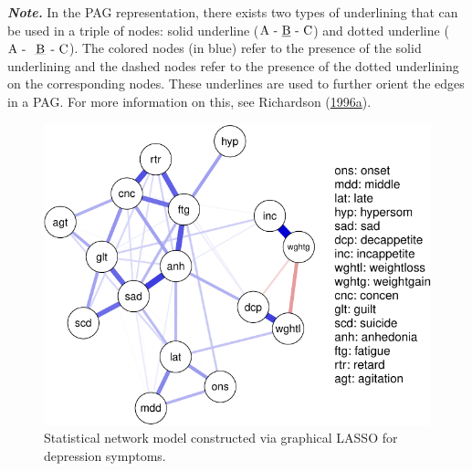 \documentclass[
]{article}
\begin{document}
\vspace{-0.1cm}

\noindent\small\textit{\textbf{Note.}} In the PAG representation, there exists two types of underlining that can be used in a triple of nodes: solid underline (\(\text{A - {\underline{B} - C}}\)) and dotted underline (\(\text{A - {
    \tikz[baseline=(todotted.base)]{
        \node[inner sep=1pt,outer sep=0pt] (todotted) {B};
        \draw[densely dotted] (todotted.south west) -- (todotted.south east);
    }
 - C}}\)). The colored nodes (in blue) refer to the presence of the solid underlining and the dashed nodes refer to the presence of the dotted underlining on the corresponding nodes. These underlines are used to further orient the edges in a PAG. For more information on this, see Richardson (\protect\hyperlink{ref-Richardson1996a}{1996a}).

\normalsize
{}

\begin{figure}

{\centering \includegraphics{Individual-report_files/figure-latex/mcnallynetwork-1} 

}

\caption{Statistical network model constructed via graphical LASSO for depression symptoms.}\label{fig:mcnallynetwork}
\end{figure}
\end{document}
